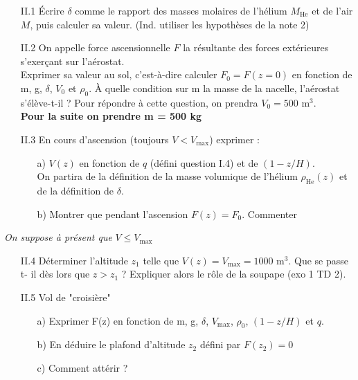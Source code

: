 \documentclass[a4paper,12pt]{article}
\newcommand{\bepar}[1]{
	\left( #1 \right)  
}
\begin{document}
\begin{itemize}[leftmargin=1.4cm]
	\item[II.1] Écrire $\delta$ comme le rapport des masses molaires de l'hélium $M_{\text{He}}$ et de l'air $M$, puis calculer sa valeur. (Ind. utiliser les hypothèses de la note 2)
	\item[II.2] On appelle force ascensionnelle $F$ la résultante des forces extérieures s'exerçant sur l'aérostat.\\
	Exprimer sa valeur au sol, c'est-à-dire calculer $F_0 = F(z=0)$ en fonction de m, g, $\delta$, $V_0$ et $\rho_0$. À quelle condition sur m la masse de la nacelle, l'aérostat s'élève-t-il ? Pour répondre à cette question, on prendra $V_0 = 500 \text{ m}^3$. \\
	\textbf{Pour la suite on prendre m = 500 kg} \\[1mm]
	\item[II.3] En cours d'ascension (toujours $V<V_{\text{max}}$) exprimer :
	\begin{itemize}
		\item[a)] $V(z)$ en fonction de $q$ (défini question I.4) et de $(1-z/H)$.\\	On partira de la définition de la masse volumique de l'hélium $\rho_{\text{He}}(z)$ et de la définition de $\delta$.
		\item[b)] Montrer que pendant l'ascension $F(z) = F_0$. Commenter \\[3mm]
	\end{itemize}
\end{itemize}

\textit{On suppose à présent que} $V\leq V_{\text{max}}$
\begin{itemize}[leftmargin=1.4cm]
	\item[II.4] Déterminer l'altitude $z_1$ telle que $V(z) = V_{\text{max}} = 1000 \text{ m}^3$. Que se passe t- il dès lors que $z > z_1$ ? Expliquer alors le rôle de la soupape (exo 1 TD 2). \\[1mm]
	\item[II.5] Vol de "croisière"
	\begin{itemize}
		\item[a)] Exprimer F(z) en fonction de m, g, $\delta$, $V_{\text{max}}$, $\rho_0$, $\bepar{1 - z/H}$ et $q$.
		\item[b)] En déduire le plafond d'altitude $z_2$ défini par $F(z_2) = 0$
		\item[c)] Comment attérir ?
	\end{itemize}
\end{itemize}
\end{document}
